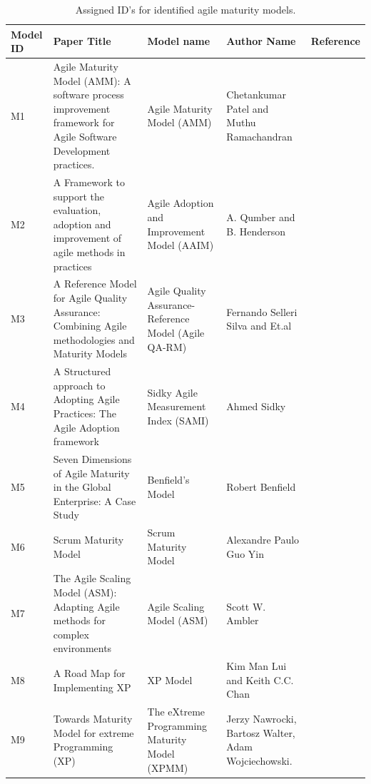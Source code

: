 \documentclass[a4paper,oneside]{bth}
\begin{document}
\begin{longtable}[h] {|p{2cm}|p{3cm}|p{2.8cm}|p{2.5cm}|p{2cm}|}

\caption{Assigned ID's for identified agile maturity models. \label{ID} }\\
\hline
\textbf{Model ID} & \textbf{Paper Title} & \textbf{Model name} & \textbf{Author Name}& \textbf{Reference}\\ \hline
M1& Agile Maturity Model (AMM): A software process
improvement framework for Agile Software Development 
practices. & Agile Maturity Model (AMM)& Chetankumar Patel and Muthu Ramachandran& \cite{patel_agile_2009}\\ \hline
M2& A Framework to support the evaluation, adoption
and improvement of agile methods in practices & Agile Adoption and Improvement Model (AAIM) & A. Qumber and B. Henderson & \cite{qumer_framework_2008}\\ \hline
M3 & A Reference Model for Agile Quality Assurance: Combining Agile methodologies and Maturity Models & Agile Quality Assurance-Reference Model (Agile QA-RM) & Fernando Selleri Silva and Et.al & \cite{selleri_silva_reference_2014}\\ \hline
M4 & A Structured approach to Adopting Agile Practices:
The Agile Adoption framework & Sidky Agile Measurement Index (SAMI) & Ahmed Sidky & \cite{sidky_structured_2007}\\ \hline
M5 & Seven Dimensions of Agile Maturity in the Global Enterprise: A Case Study & Benfield's Model & Robert Benfield & \cite{benefield_seven_2010}\\ \hline
M6 & Scrum Maturity Model& Scrum Maturity Model&Alexandre Paulo Guo Yin& \cite{yin_scrum_2011}\\ \hline
M7 & The Agile Scaling Model (ASM): Adapting Agile methods for complex environments& Agile Scaling Model (ASM) & Scott W. Ambler& \cite{ambler_agile_2009}\\ \hline
M8 & A Road Map for Implementing XP & XP Model& Kim Man Lui and Keith C.C. Chan& \cite{lui_road_2005}\\ \hline
M9& Towards Maturity Model for extreme Programming (XP) & The eXtreme Programming Maturity Model (XPMM) & Jerzy Nawrocki, Bartosz Walter, Adam Wojciechowski.& \cite{nawrocki_toward_2001}\\ \hline
\end{longtable}
\end{document}
